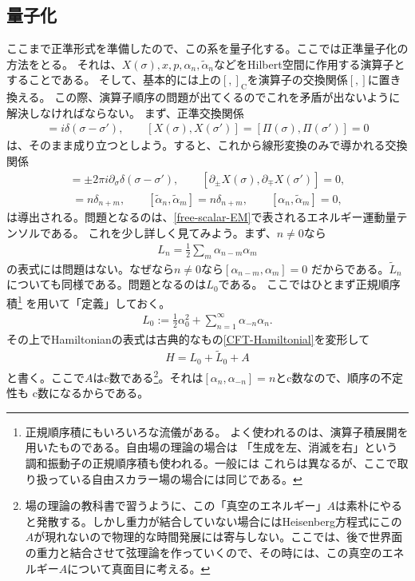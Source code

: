 \documentclass[report,paper=a4, fontsize=12pt, line_length=16cm, number_of_lines=33,dvipdfmx]{jlreq}
\numberwithin{equation}{chapter}
\numberwithin{equation}{section}
\newcommand{\del}{\partial}
\newcommand{\alphat}{\tilde{\alpha}}
\newcommand{\Lt}{\widetilde{L}}
\newcommand{\cbk}[1]{[#1]_{\mathrm{C}}}
\begin{document}
\subsection{量子化}
ここまで正準形式を準備したので、この系を量子化する。ここでは正準量子化の方法をとる。
それは、$X(\sigma),x,p,\alpha_n,\alphat_n$などをHilbert空間に作用する演算子とすることである。
そして、基本的には上の$\cbk{,}$を演算子の交換関係$[,]$に置き換える。
この際、演算子順序の問題が出てくるのでこれを矛盾が出ないように解決しなければならない。
まず、正準交換関係
\begin{align}
[X(\sigma),\Pi(\sigma')]=i\delta(\sigma-\sigma'),\qquad
[X(\sigma),X(\sigma')]=
[\Pi(\sigma),\Pi(\sigma')]=0
\end{align}
は、そのまま成り立つとしよう。すると、これから線形変換のみで導かれる交換関係
\begin{align}
[\del_{\pm}X(\sigma),\del_{\pm}X(\sigma')]
=\pm 2\pi i \del_{\sigma}\delta(\sigma-\sigma'),\qquad
[\del_{\pm}X(\sigma),\del_{\mp}X(\sigma')]=0,
\end{align}
\begin{align}
[\alpha_{n},\alpha_{m}]=n\delta_{n+m},\qquad
[\alphat_{n},\alphat_{m}]=n\delta_{n+m},\qquad
[\alpha_{n},\alphat_{m}]=0,
\end{align}
は導出される。問題となるのは、\eqref{free-scalar-EM}で表されるエネルギー運動量テンソルである。
これを少し詳しく見てみよう。まず、$n\ne 0$なら
\begin{align}
L_n=\frac12 \sum_m \alpha_{n-m}\alpha_{m}
\end{align}
の表式には問題はない。なぜなら$n\ne 0$なら$[\alpha_{n-m},\alpha_{m}]=0$
だからである。$\Lt_n$についても同様である。問題となるのは$L_0$である。
ここではひとまず正規順序積\footnote{正規順序積にもいろいろな流儀がある。
よく使われるのは、演算子積展開を用いたものである。自由場の理論の場合は
「生成を左、消滅を右」という調和振動子の正規順序積も使われる。一般には
これらは異なるが、ここで取り扱っている自由スカラー場の場合には同じである。}
を用いて「定義」しておく。
\begin{align}
L_0:=\frac12 \alpha_0^2+\sum_{n=1}^{\infty}\alpha_{-n}\alpha_{n}.
\end{align}
その上でHamiltonianの表式は古典的なもの\eqref{CFT-Hamiltonial}を変形して
\begin{align}
H=L_0+\Lt_0+A
\end{align}
と書く。ここで$A$はc数である\footnote{場の理論の教科書で習うように、この「真空のエネルギー」$A$は素朴にやると発散する。しかし重力が結合していない場合にはHeisenberg方程式にこの$A$が現れないので物理的な時間発展には寄与しない。ここでは、後で世界面の重力と結合させて弦理論を作っていくので、その時には、この真空のエネルギー$A$について真面目に考える。}。それは$[\alpha_n,\alpha_{-n}]=n$とc数なので、順序の不定性も
c数になるからである。
\end{document}
